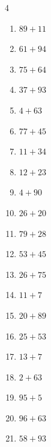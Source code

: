 \begin{multicols}{4}
\begin{enumerate}
  \item $89+11$
        \phantom{$=100$}

  \item $61+94$
        \phantom{$=155$}

  \item $75+64$
        \phantom{$=139$}

  \item $37+93$
        \phantom{$=130$}

  \item $4+63$
        \phantom{$=67$}

  \item $77+45$
        \phantom{$=122$}

  \item $11+34$
        \phantom{$=45$}

  \item $12+23$
        \phantom{$=35$}

  \item $4+90$
        \phantom{$=94$}

  \item $26+20$
        \phantom{$=46$}

  \item $79+28$
        \phantom{$=107$}

  \item $53+45$
        \phantom{$=98$}

  \item $26+75$
        \phantom{$=101$}

  \item $11+7$
        \phantom{$=18$}

  \item $20+89$
        \phantom{$=109$}

  \item $25+53$
        \phantom{$=78$}

\columnbreak %

\resetques

  \item $13+7$
        \phantom{$=20$}

  \item $2+63$
        \phantom{$=65$}

  \item $95+5$
        \phantom{$=100$}

  \item $96+63$
        \phantom{$=159$}

  \item $58+93$
        \phantom{$=151$}


\end{enumerate}
\end{multicols}
